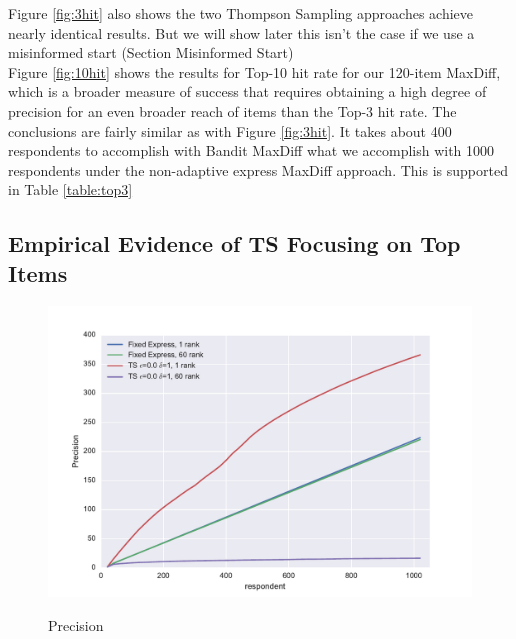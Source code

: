 \documentclass[nonblindrev]{informs3}
\begin{document}
Figure \ref{fig:3hit} also shows the two Thompson Sampling approaches achieve nearly identical results. But we will show later this isn't the case if we use a misinformed start (Section Misinformed Start)\\
Figure \ref{fig:10hit} shows the results for Top-10 hit rate for our 120-item MaxDiff, which is a broader measure of success that requires obtaining a high degree of precision for an even broader reach of items than the Top-3 hit rate.  The conclusions are fairly similar as with Figure \ref{fig:3hit}.  It takes about 400 respondents to accomplish with Bandit MaxDiff what we accomplish with 1000 respondents under the non-adaptive express MaxDiff approach. This is supported in Table \ref{table:top3}\\
\subsection{Empirical Evidence of TS Focusing on Top Items}
\begin{figure}
\caption{Precision}
\includegraphics[width=1\textwidth]{plots/precision.pdf}
\label{fig:per}
\end{figure}
\end{document}
